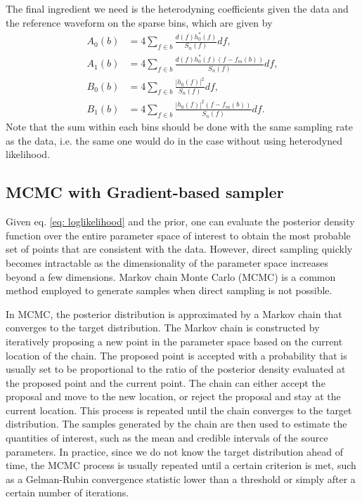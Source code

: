 \documentclass[twocolumn]{aastex631}
\begin{document}
The final ingredient we need is the heterodyning coefficients given the data and
the reference waveform on the sparse bins, which are given by
\begin{align}
    A_0(b) &= 4 \sum_{f \in b} \frac{d(f)h^*_0(f)}{S_n(f)} df, \\
    A_1(b) &= 4 \sum_{f \in b} \frac{d(f)h^*_0(f)(f-f_m(b))}{S_n(f)} df, \\
    B_0(b) &= 4 \sum_{f \in b} \frac{|h_0(f)|^2}{S_n(f)} df, \\
    B_1(b) &= 4 \sum_{f \in b} \frac{|h_0(f)|^2(f-f_m(b))}{S_n(f)} df.
\end{align}
Note that the sum within each bins should be done with the same sampling rate as
the data, i.e. the same one would do in the case without using heterodyned
likelihood.

\subsection{MCMC with Gradient-based sampler}
\label{sec:gradient}

Given eq. \ref{eq: loglikelihood} and the prior, one can evaluate the posterior
density function over the entire parameter space of interest to obtain the most
probable set of points that are consistent with the data. However, direct
sampling quickly becomes intractable as the dimensionality of the parameter
space increases beyond a few dimensions. Markov chain Monte Carlo (MCMC) is a
common method employed to generate samples when direct sampling is not possible.

In MCMC, the posterior distribution is approximated by a Markov chain that
converges to the target distribution. The Markov chain is constructed by
iteratively proposing a new point in the parameter space based on the current
location of the chain. The proposed point is accepted with a probability that is
usually set to be proportional to the ratio of the posterior density evaluated
at the proposed point and the current point. The chain can either accept the
proposal and move to the new location, or reject the proposal and stay at the
current location. This process is repeated until the chain converges to the
target distribution. The samples generated by the chain are then used to
estimate the quantities of interest, such as the mean and credible intervals of
the source parameters. In practice, since we do not know the target distribution
ahead of time, the MCMC process is usually repeated until a certain criterion is
met, such as a Gelman-Rubin convergence statistic \cite{Gelman-rhat} lower than
a threshold or simply after a certain number of iterations.
\end{document}
